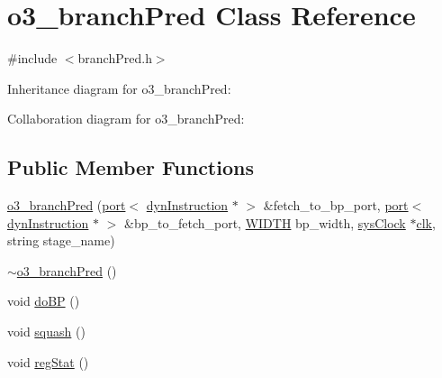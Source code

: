 \hypertarget{classo3__branchPred}{
\section{o3\_\-branchPred Class Reference}
\label{classo3__branchPred}
}


{\ttfamily \#include $<$branchPred.h$>$}



Inheritance diagram for o3\_\-branchPred:


Collaboration diagram for o3\_\-branchPred:
\subsection*{Public Member Functions}
\begin{DoxyCompactItemize}
\item 
\hyperlink{classo3__branchPred_ad4d7447f4f755c074ad7ccb01b4184fd}{o3\_\-branchPred} (\hyperlink{classport}{port}$<$ \hyperlink{classdynInstruction}{dynInstruction} $\ast$ $>$ \&fetch\_\-to\_\-bp\_\-port, \hyperlink{classport}{port}$<$ \hyperlink{classdynInstruction}{dynInstruction} $\ast$ $>$ \&bp\_\-to\_\-fetch\_\-port, \hyperlink{global_2global_8h_a6fa2e24b8a418fa215e183264cbea3aa}{WIDTH} bp\_\-width, \hyperlink{classsysClock}{sysClock} $\ast$\hyperlink{g__objs_8h_afc4784c140eed1743728e83840e91c12}{clk}, string stage\_\-name)
\item 
\hyperlink{classo3__branchPred_ab497c6edb4266e04ae0b20969caeb525}{$\sim$o3\_\-branchPred} ()
\item 
void \hyperlink{classo3__branchPred_a7f06389c8e205c2eba33c3727a542314}{doBP} ()
\item 
void \hyperlink{classo3__branchPred_a255cd46c77b1600bd989938fcf0f6f70}{squash} ()
\item 
void \hyperlink{classo3__branchPred_a39d33c191ad5a75b6fa1acf84d5c5044}{regStat} ()
\end{DoxyCompactItemize}


